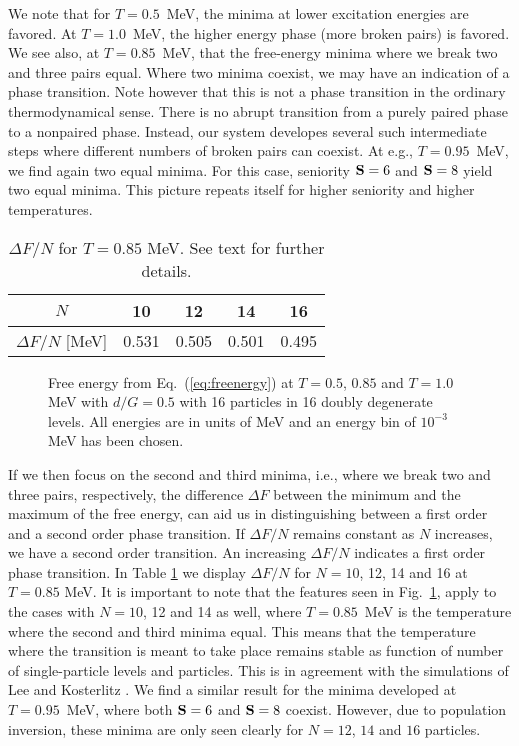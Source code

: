 \documentclass{elsart}
\begin{document}
We note that for $T=0.5$~MeV, the minima at lower excitation
energies are favored. 
At $T=1.0$~MeV, the higher energy
phase (more broken pairs) is favored.
We see also, at $T=0.85$~MeV, that 
the free-energy minima where we break two and three pairs 
equal. 
Where two minima coexist, we may have an
indication  of a phase transition. Note however that this is not a 
phase transition in the ordinary thermodynamical sense.
There is no abrupt transition from a purely paired phase to a 
nonpaired phase.  
Instead, our system developes several such intermediate steps
where different numbers of broken pairs can coexist. 
At e.g., $T=0.95$~MeV, we find again two equal minima. For this case,
seniority ${\bf S}=6$ and ${\bf S}=8$ yield two equal minima.
This picture repeats itself for higher seniority and higher temperatures.
\begin{table}[b]
\begin{center}
\begin{tabular}{ccccc}\hline
$N$ & 10 & 12 & 14& 16 \\\hline
$\Delta F/N$ [MeV]   &0.531 & 0.505 & 0.501 & 0.495 \\\hline
\end{tabular} 
\caption{ $\Delta F/N$ for $T=0.85$ MeV. See text for further details.} 
\end{center}
\label{tab:free_energy10_16}
\end{table}
\begin{figure}
\begin{center}
          {\epsfxsize=20pc }
\caption{Free energy from Eq.~(\ref{eq:freenergy}) at $T=0.5$, $0.85$ and
         $T=1.0$ MeV  with 
         $d/G=0.5$ with 16 particles in 16 doubly degenerate
         levels. All energies are in units of MeV and 
         an energy bin of $10^{-3}$ MeV has been chosen.}
\label{fig:free_energy16}
\end{center} 
\end{figure}
If we then focus on the second and third minima, i.e., where we break
two and three pairs, respectively, the difference $\Delta F$ between the 
minimum and the maximum of the free energy, can aid us in distinguishing
between a first order and a second order phase transition. If $\Delta F/N$
remains constant as $N$
increases, we have a second order transition. An increasing $\Delta F/N$
indicates a first order phase transition. 
In Table \ref{tab:free_energy10_16} we display $\Delta F/N$ for 
$N=10$, 12, 14 and 16 at $T=0.85$ MeV. 
It is important to note that the features
seen in Fig.~\ref{fig:free_energy16}, apply to the cases with $N=10$, 12 
and 14 as well, where $T=0.85$~MeV is the temperature where the second and
third minima equal. This means that the temperature where the transition
is meant to take place remains stable as function of number of single-particle
levels and particles. This is in agreement with the simulations of 
Lee and Kosterlitz \cite{prl90}. We find a similar result for the minima
developed at $T=0.95$~MeV, where both ${\bf S}=6$ and ${\bf S}=8$ coexist.
However, due to population inversion, these minima are only seen clearly
for $N=12$, $14$ and $16$ particles.
\end{document}
